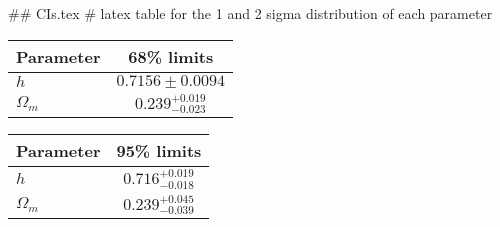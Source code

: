 ## CIs.tex
# latex table for the 1 and 2 sigma distribution of each parameter

\begin{tabular} { l  c}
 Parameter &  68\% limits\\
\hline
{\boldmath$h              $} & $0.7156\pm 0.0094          $\\
{\boldmath$\Omega_m       $} & $0.239^{+0.019}_{-0.023}   $\\
\hline
\end{tabular}

\begin{tabular} { l  c}
 Parameter &  95\% limits\\
\hline
{\boldmath$h              $} & $0.716^{+0.019}_{-0.018}   $\\
{\boldmath$\Omega_m       $} & $0.239^{+0.045}_{-0.039}   $\\
\hline
\end{tabular}
